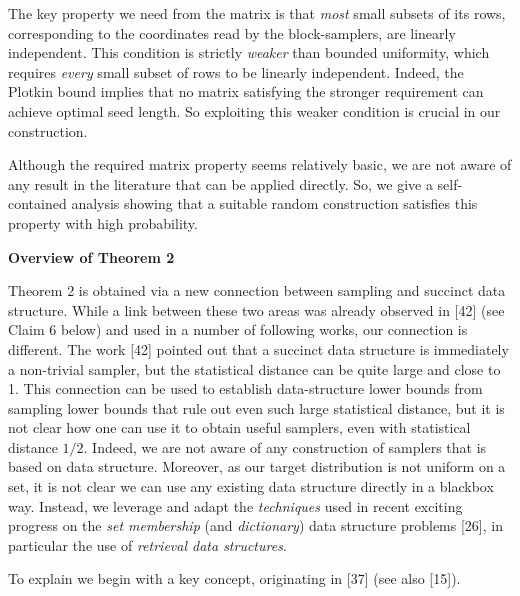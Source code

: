 The key property we need from the matrix is that \emph{most} small subsets of its rows, corresponding to the coordinates read by the block-samplers, are linearly independent.
This condition is strictly \emph{weaker} than bounded uniformity, which requires \emph{every} small subset of rows to be linearly independent.
Indeed, the Plotkin bound implies that no matrix satisfying the stronger requirement can achieve optimal seed length.
So exploiting this weaker condition is crucial in our construction.\par




Although the required matrix property seems relatively basic, we are not aware of any result in the literature that can be applied directly. So, we give a self-contained analysis showing that a suitable random construction satisfies this property with high probability.\par





\par\medskip\noindent\textbf{Overview of Theorem 2
}\par




Theorem 2 is obtained via a new connection between sampling and succinct data structure. While a link between these two areas was already observed in [42] (see Claim 6 below) and used in a number of following works, our connection is different.
The work [42] pointed out that a succinct data structure is immediately a non-trivial sampler, but the statistical distance can be quite large and close to 1. This connection can be used to establish data-structure lower bounds from sampling lower bounds that rule out even such large statistical distance, but it is not clear how one can use it to obtain useful samplers, even with statistical distance $1/2$. Indeed, we are not aware of any construction of samplers that is based on data structure. Moreover, as our target distribution is not uniform on a set, it is not clear we can use any existing data structure directly in a blackbox way. Instead, we leverage and adapt the \emph{techniques} used in recent exciting progress on the \emph{set membership} (and \emph{dictionary}) data structure problems [26], in particular the use of \emph{retrieval data structures}.\par




To explain we begin with a key concept, originating in [37] (see also [15]).\par



